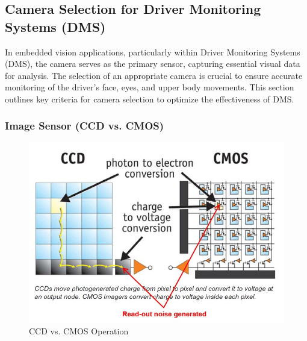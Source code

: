 \subsection{Camera Selection for Driver Monitoring Systems (DMS)}

In embedded vision applications, particularly within Driver Monitoring Systems (DMS), the camera serves as the primary sensor, capturing essential visual data for analysis. The selection of an appropriate camera is crucial to ensure accurate monitoring of the driver's face, eyes, and upper body movements. This section outlines key criteria for camera selection to optimize the effectiveness of DMS.

\subsubsection{\textbf{Image Sensor} (CCD vs. CMOS)}


\begin{figure}[!h]
     \centering
     \includegraphics[scale =0.3]{Images/4.1_Camera_Selection/CCDVsCMOS.jpg}
     \caption{CCD vs. CMOS Operation}
     \label{fig:CCDVsCMOS}
\end{figure}

